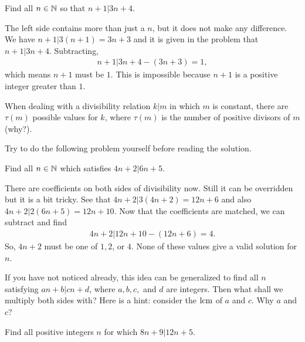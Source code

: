 \documentclass{subfile}
\begin{document}
		\begin{problem}
			Find all $n \in \mathbb{N}$ so that $n+1|3n+4$.
		\end{problem}

		\begin{solution}
			The left side contains more than just a $n$, but it does not make any difference. We have $n+1|3(n+1)=3n+3$ and it is given in the problem that $n+1|3n+4$. Subtracting,
				\begin{align*}
					n+1|3n+4-(3n+3)=1,
				\end{align*}
			which means $n+1$ must be $1$. This is impossible because $n+1$ is a positive integer greater than $1$.
		\end{solution}

		\begin{note}
			When dealing with a divisibility relation $k|m$ in which $m$ is constant, there are $\tau(m)$ possible values for $k$, where $\tau(m)$ is the number of positive divisors of $m$ (why?).
		\end{note}
	Try to do the following problem yourself before reading the solution.
		\begin{problem}
			Find all $n\in\mathbb{N}$ which satisfies $4n+2|6n+5$.
		\end{problem}

		\begin{solution}
			There are coefficients on both sides of divisibility now. Still it can be overridden but it is a bit tricky. See that $4n+2|3(4n+2)=12n+6$ and also $4n+2|2(6n+5)=12n+10$. Now that the coefficients are matched, we can subtract and find
				\begin{align*}
					4n+2|12n+10-(12n+6)=4.
				\end{align*}
			So, $4n+2$ must be one of $1,2$, or $4$. None of these values give a valid solution for $n$.
		\end{solution}
	If you have not noticed already, this idea can be generalized to find all $n$ satisfying $an+b|cn+d$, where $a,b,c,$ and $d$ are integers. Then what shall we multiply both sides with? Here is a hint: consider the $\operatorname{lcm}$ of $a$ and $c$. Why $a$ and $c$?
		\begin{problem}\label{prob:ex1}
			Find all positive integers $n$ for which $8n+9|12n+5$.
		\end{problem}
\end{document}
